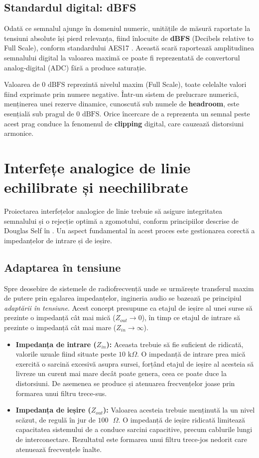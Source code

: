 \subsection{Standardul digital: dBFS}
Odată ce semnalul ajunge în domeniul numeric, unitățile de măsură raportate la tensiuni absolute își pierd relevanța, fiind înlocuite de \textbf{dBFS} (Decibels relative to Full Scale), conform standardului AES17 \cite{aes17_2020}. Această scară raportează amplitudinea semnalului digital la valoarea maximă ce poate fi reprezentată de convertorul analog-digital (ADC) fără a produce saturație.

Valoarea de $0\text{ dBFS}$ reprezintă nivelul maxim (Full Scale), toate celelalte valori fiind exprimate prin numere negative. Într-un sistem de prelucrare numerică, menținerea unei rezerve dinamice, cunoscută sub numele de \textbf{headroom}, este esențială sub pragul de $0\text{ dBFS}$. Orice încercare de a reprezenta un semnal peste acest prag conduce la fenomenul de \textbf{clipping} digital, care cauzează distorsiuni armonice.

\section{Interfețe analogice de linie echilibrate și neechilibrate}
Proiectarea interfețelor analogice de linie trebuie să asigure integritatea semnalului și o rejecție optimă a zgomotului, conform principiilor descrise de Douglas Self în \cite{douglasself}. Un aspect fundamental în acest proces este gestionarea corectă a impedanțelor de intrare și de ieșire.

\subsection{Adaptarea în tensiune}
Spre deosebire de sistemele de radiofrecvență unde se urmărește transferul maxim de putere prin egalarea impedanțelor, ingineria audio se bazează pe principiul \textit{adaptării în tensiune}. Acest concept presupune ca etajul de ieșire al unei surse să prezinte o impedanță cât mai mică ($Z_{out} \to 0$), în timp ce etajul de intrare să prezinte o impedanță cât mai mare ($Z_{in} \to \infty$).

\begin{itemize}
    \item \textbf{Impedanța de intrare ($Z_{in}$):} Aceasta trebuie să fie suficient de ridicată, valorile uzuale fiind situate peste $10\text{ k}\Omega$. O impedanță de intrare prea mică exercită o sarcină excesivă asupra sursei, forțând etajul de ieșire al acesteia să livreze un curent mai mare decât poate genera, ceea ce poate duce la distorsiuni. De asemenea se produce și atenuarea frecvențelor joase prin formarea unui filtru trece-sus.
    \item \textbf{Impedanța de ieșire ($Z_{out}$):} Valoarea acesteia trebuie menținută la un nivel scăzut, de regulă în jur de  $100\text{ }\Omega$. O impedanță de ieșire ridicată limitează capacitatea sistemului de a conduce sarcini capacitive, precum cablurile lungi de interconectare. Rezultatul este formarea unui filtru trece-jos nedorit care atenuează frecvențele înalte.
\end{itemize}

